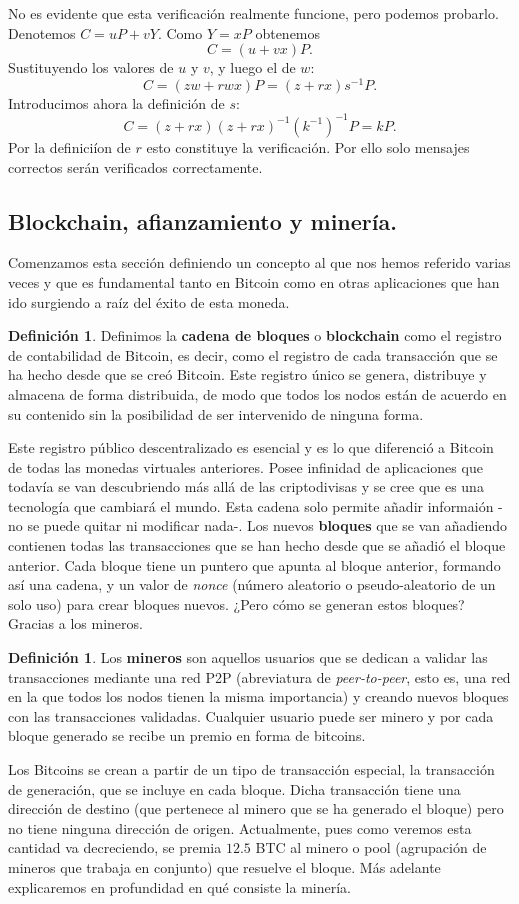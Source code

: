 \documentclass[twoside]{article}
\theoremstyle{definition}
\newtheorem{defi}[teorema]{Definición}
\begin{document}
No es evidente que esta verificación realmente funcione, pero podemos probarlo. Denotemos $C=uP+vY$. Como $Y=xP$ obtenemos $$C=(u+vx)P.$$ Sustituyendo los valores de $u$ y $v$, y luego el de $w$: $$ C=(zw+rwx)P= (z+rx)s^{-1}P.$$ Introducimos ahora la definición de $s$: $$C=(z+rx)(z+rx)^{-1}(k^{-1})^{-1}P=kP.$$ Por la definiciíon de $r$ esto constituye la verificación. Por ello solo mensajes correctos serán verificados correctamente. 
\subsection{Blockchain, afianzamiento y minería.}

Comenzamos esta sección definiendo un concepto al que nos hemos referido varias veces y que es fundamental tanto en Bitcoin como en otras aplicaciones que han ido surgiendo a raíz del éxito de esta moneda. 
\begin{defi}
Definimos la \textbf{cadena de bloques} o \textbf{blockchain} como el registro de contabilidad de Bitcoin, es decir, como el registro de cada transacción que se ha hecho desde que se creó Bitcoin. Este registro único se genera, distribuye y almacena de forma distribuida, de modo que todos los nodos están de acuerdo en su contenido sin la posibilidad de ser intervenido de ninguna forma. 
\end{defi}

Este registro público descentralizado es esencial y es lo que diferenció a Bitcoin de todas las monedas virtuales anteriores. Posee infinidad de aplicaciones que todavía se van descubriendo más allá de las criptodivisas y se cree que es una tecnología que cambiará el mundo. Esta cadena solo permite añadir informaión -no se puede quitar ni modificar nada-. Los nuevos \textbf{bloques} que se van añadiendo contienen todas las transacciones que se han hecho desde que se añadió el bloque anterior. Cada bloque tiene un puntero que apunta al bloque anterior, formando así una cadena, y un valor de \textit{nonce} (número aleatorio o pseudo-aleatorio de un solo uso) para crear bloques nuevos. ¿Pero cómo se generan estos bloques? Gracias a los mineros.
\begin{defi}
Los \textbf{mineros} son aquellos usuarios que se dedican a validar las transacciones mediante una red P2P (abreviatura de \emph{peer-to-peer}, esto es, una red en la que todos los nodos tienen la misma importancia) y creando nuevos bloques con las transacciones validadas. Cualquier usuario puede ser minero y por cada bloque generado se recibe un premio en forma de bitcoins. 
\end{defi}
Los Bitcoins se crean a partir de un tipo de transacción especial, la transacción de generación, que se incluye en cada bloque. Dicha transacción tiene una dirección de destino (que pertenece al minero que se ha generado el bloque) pero no tiene ninguna dirección de origen. Actualmente, pues como veremos esta cantidad va decreciendo, se premia $12.5$ BTC al minero o pool (agrupación de mineros que trabaja en conjunto) que resuelve el bloque. Más adelante explicaremos en profundidad en qué consiste la minería.
\end{document}
